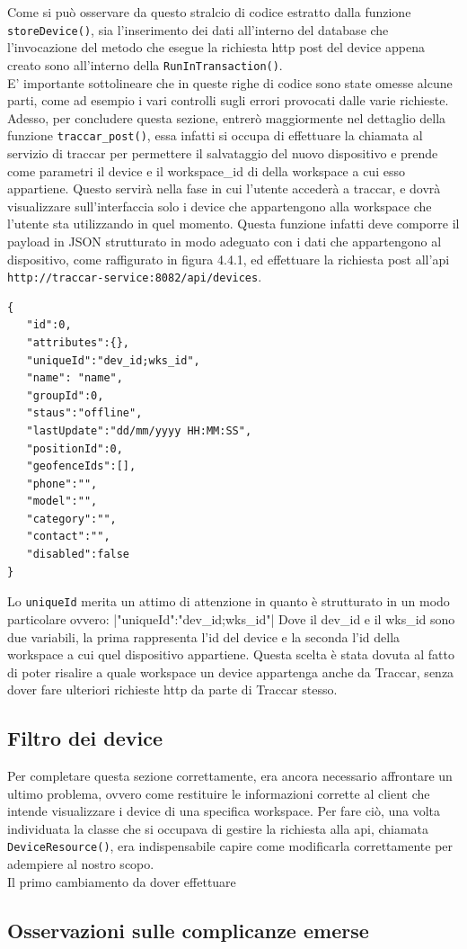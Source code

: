 \documentclass[a4paper,titlepage,12pt]{book}
\begin{document}
\noindent Come si può osservare da questo stralcio di codice estratto dalla funzione \texttt{storeDevice()}, sia l'inserimento dei dati all'interno del database che l'invocazione del metodo che esegue la richiesta http post del device appena creato sono all'interno della \texttt{RunInTransaction()}.\\
E' importante sottolineare che in queste righe di codice sono state omesse alcune parti, come ad esempio i vari controlli sugli errori provocati dalle varie richieste.\\
Adesso, per concludere questa sezione, entrerò maggiormente nel dettaglio della funzione \texttt{traccar\_post()}, essa infatti si occupa di effettuare la chiamata al servizio di traccar per permettere il salvataggio del nuovo dispositivo e prende come parametri il device e il workspace\_id di della workspace a cui esso appartiene. Questo servirà nella fase in cui l'utente accederà a traccar, e dovrà visualizzare sull'interfaccia solo i device che appartengono alla workspace che l'utente sta utilizzando in quel momento. Questa funzione infatti deve comporre il payload in JSON strutturato in modo adeguato con i dati che appartengono al dispositivo, come raffigurato in figura 4.4.1, ed effettuare la richiesta post all'api \texttt{http://traccar-service:8082/api/devices}.

\begin{verbatim}
{
   "id":0,
   "attributes":{},
   "uniqueId":"dev_id;wks_id",
   "name": "name",
   "groupId":0,
   "staus":"offline",
   "lastUpdate":"dd/mm/yyyy HH:MM:SS",
   "positionId":0,
   "geofenceIds":[],
   "phone":"",
   "model":"",
   "category":"",
   "contact":"",
   "disabled":false
}

\end{verbatim}


\noindent Lo \texttt{uniqueId} merita un attimo di attenzione in quanto è strutturato in un modo particolare ovvero:
|"uniqueId":"dev_id;wks_id"|
\noindent Dove il dev\_id e il wks\_id sono due variabili, la prima rappresenta l'id del device e la seconda l'id della workspace a cui quel dispositivo appartiene. Questa scelta è stata dovuta al fatto di poter risalire a quale workspace un device appartenga anche da Traccar, senza dover fare ulteriori richieste http da parte di Traccar stesso.


\subsection{\sffamily 
Filtro dei device}
Per completare questa sezione correttamente, era ancora necessario affrontare un ultimo problema, ovvero come restituire le informazioni corrette al client che intende visualizzare i device di una specifica workspace. Per fare ciò, una volta individuata la classe che si occupava di gestire la richiesta alla api, chiamata \texttt{DeviceResource()}, era indispensabile capire come modificarla correttamente per adempiere al nostro scopo.\\
Il primo cambiamento da dover effettuare



\subsection{\sffamily
Osservazioni sulle complicanze emerse}
\end{document}
